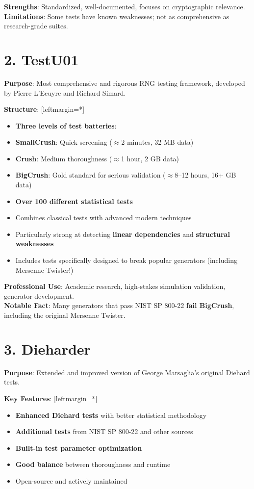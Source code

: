 \documentclass[12pt]{article}
\begin{document}
\textbf{Strengths}: Standardized, well-documented, focuses on cryptographic relevance. \\
\textbf{Limitations}: Some tests have known weaknesses; not as comprehensive as research-grade suites.

\section*{2. TestU01}

\textbf{Purpose}: Most comprehensive and rigorous RNG testing framework, developed by Pierre L'Ecuyre and Richard Simard.

\textbf{Structure}:
[leftmargin=*]
    \begin{itemize}
    \item \textbf{Three levels of test batteries}:

        \item \textbf{SmallCrush}: Quick screening ($\approx$2 minutes, 32 MB data)
        \item \textbf{Crush}: Medium thoroughness ($\approx$1 hour, 2 GB data)  
        \item \textbf{BigCrush}: Gold standard for serious validation ($\approx$8--12 hours, 16+ GB data)
    \item \textbf{Over 100 different statistical tests}
    \item Combines classical tests with advanced modern techniques
    \item Particularly strong at detecting \textbf{linear dependencies} and \textbf{structural weaknesses}
    \item Includes tests specifically designed to break popular generators (including Mersenne Twister!)
\end{itemize}

\textbf{Professional Use}: Academic research, high-stakes simulation validation, generator development. \\
\textbf{Notable Fact}: Many generators that pass NIST SP 800-22 \textbf{fail BigCrush}, including the original Mersenne Twister.

\section*{3. Dieharder}

\textbf{Purpose}: Extended and improved version of George Marsaglia's original Diehard tests.

\textbf{Key Features}:
[leftmargin=*]
\begin{itemize}
    \item \textbf{Enhanced Diehard tests} with better statistical methodology
    \item \textbf{Additional tests} from NIST SP 800-22 and other sources
    \item \textbf{Built-in test parameter optimization}
    \item \textbf{Good balance} between thoroughness and runtime
    \item Open-source and actively maintained
\end{itemize}
\end{document}
